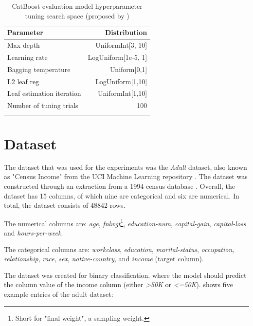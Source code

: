 \begin{table}[H]
	\centering
	\begin{tabular}{lr}
		\toprule
		Parameter                 & Distribution        \\
		\midrule
		Max depth                 & UniformInt[3, 10]   \\
		Learning rate             & LogUniform[1e-5, 1] \\
		Bagging temperature       & Uniform[0,1]        \\
		L2 leaf reg               & LogUniform[1,10]    \\
		Leaf estimation iteration & UniformInt[1,10]    \\
		\midrule
		Number of tuning trials   & 100                 \\
		\bottomrule
		\multicolumn{2}{c}{}\\[-0.6em]
	\end{tabular}
	\caption[CatBoost Hyperparameter Search Space]{CatBoost evaluation model hyperparameter tuning search space (proposed by \cite{gorishniy2021RevisitingDeepLearning})}
	\label{tab:catboost_tune}
\end{table}

\section{Dataset}
\label{ch:methods-datasets}

The dataset that was used for the experiments was the \textit{Adult} dataset, also known as "Census Income" from the UCI Machine Learning repository \cite{Dua:2019}.
The dataset was constructed through an extraction from a 1994 census database \cite{kohavi1996ScalingAccuracyNaiveBayes}.
Overall, the dataset has 15 columns, of which nine are categorical and six are numerical.
In total, the dataset consists of 48842 rows.\newline

The numerical columns are: \textit{age}, \textit{fnlwgt}\footnote{Short for "final weight", a sampling weight.}, \textit{education-num}, \textit{capital-gain}, \textit{capital-loss} and \textit{hours-per-week}.

The categorical columns are: \textit{workclass}, \textit{education}, \textit{marital-status}, \textit{occupation}, \textit{relationship}, \textit{race}, \textit{sex}, \textit{native-country}, and \textit{income} (target column). \newline


The dataset was created for binary classification, where the \gls{model} should predict the column value of the income column (either \textit{>50K} or \textit{<=50K}).
 shows five example entries of the adult dataset:


